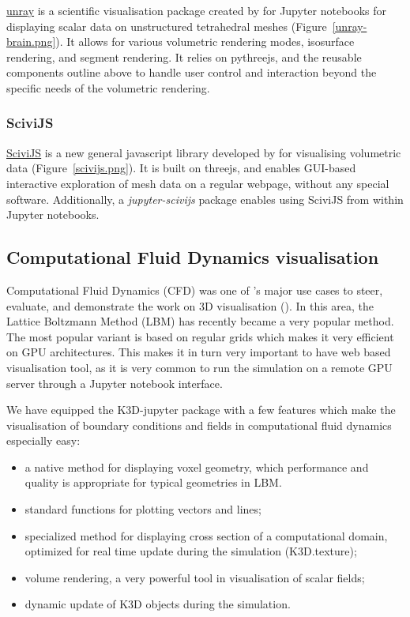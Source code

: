 \documentclass{deliverablereport}
\begin{document}
\href{https://github.com/vidartf/unray}{unray} is a scientific visualisation package created by \ODK for Jupyter notebooks for displaying
scalar data on unstructured tetrahedral meshes (Figure~\ref{unray-brain.png}). It allows for various volumetric
rendering modes, isosurface rendering, and segment rendering.
It relies on pythreejs, and the reusable components outline above to handle
user control and interaction beyond the specific needs of the volumetric
rendering.

\subsubsection{SciviJS}

\href{https://demo.logilab.fr/SciviJS/}{SciviJS} is a new general javascript library
developed by \ODK for visualising volumetric data (Figure~\ref{scivijs.png}).
It is built on threejs, and enables GUI-based interactive exploration of mesh data
on a regular webpage, without any special software.
Additionally, a \emph{jupyter-scivijs} package enables using SciviJS from within
Jupyter notebooks.

\subsection{Computational Fluid Dynamics visualisation }

Computational Fluid Dynamics (CFD) was one of \ODK's major use
cases to steer, evaluate, and demonstrate the work on 3D
visualisation ().
In this area, the Lattice Boltzmann Method (LBM) has
recently became a very popular method. The most popular variant is based on
regular grids which makes it very efficient on GPU architectures. This
makes it in turn very important to have web based visualisation tool, as
it is very common to run the simulation on a remote GPU server through
a Jupyter notebook interface.

We have equipped the K3D-jupyter package with a few features which make the
visualisation of boundary conditions and fields in computational
fluid dynamics especially easy:

\begin{itemize}
\item a native method for displaying voxel geometry,
  which performance and quality is appropriate for typical geometries
  in LBM.
\item standard functions for plotting vectors and lines;
\item specialized method for displaying cross section of
  a computational domain, optimized for real time update during the
  simulation (K3D.texture);
\item volume rendering, a very powerful tool in
  visualisation of scalar fields;
\item dynamic update of K3D objects during the simulation.
\end{itemize}
\end{document}

